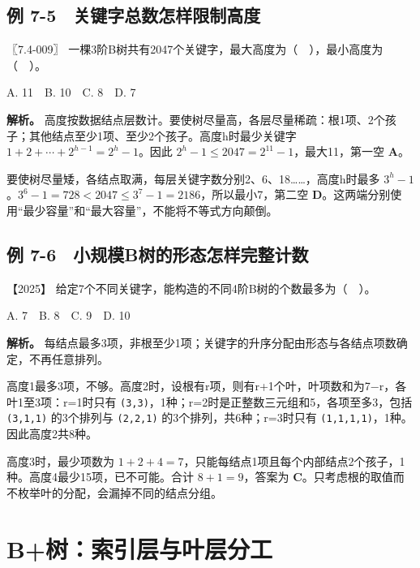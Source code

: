 \subsection{例 7-5　关键字总数怎样限制高度}\label{ds-ex7-5}

\noindent{}〖7.4-009〗 一棵3阶B树共有2047个关键字，最大高度为（　），最小高度为（　）。

A. 11　B. 10　C. 8　D. 7


\textbf{解析。} 高度按数据结点层数计。要使树尽量高，各层尽量稀疏：根1项、2个孩子；其他结点至少1项、至少2个孩子。高度h时最少关键字 \(1+2+\cdots+2^{h-1}=2^h-1\)。因此 \(2^h-1\le2047=2^{11}-1\)，最大11，第一空 \textbf{A}。

要使树尽量矮，各结点取满，每层关键字数分别2、6、18\ldots\ldots，高度h时最多 \(3^h-1\)。\(3^6-1=728<2047\le3^7-1=2186\)，所以最小7，第二空 \textbf{D}。这两端分别使用``最少容量''和``最大容量''，不能将不等式方向颠倒。

\subsection{例 7-6　小规模B树的形态怎样完整计数}\label{ds-ex7-6}

\noindent{}【2025】 给定7个不同关键字，能构造的不同4阶B树的个数最多为（　）。

A. 7　B. 8　C. 9　D. 10


\textbf{解析。} 每结点最多3项，非根至少1项；关键字的升序分配由形态与各结点项数确定，不再任意排列。

高度1最多3项，不够。高度2时，设根有r项，则有r+1个叶，叶项数和为7−r，各叶1至3项：r=1时只有 \allowbreak{}\texttt{(3,}\allowbreak{}\texttt{3)}，1种；r=2时是正整数三元组和5，各项至多3，包括 \allowbreak{}\texttt{(3,}\allowbreak{}\texttt{1,}\allowbreak{}\texttt{1)} 的3个排列与 \allowbreak{}\texttt{(2,}\allowbreak{}\texttt{2,}\allowbreak{}\texttt{1)} 的3个排列，共6种；r=3时只有 \allowbreak{}\texttt{(1,}\allowbreak{}\texttt{1,}\allowbreak{}\texttt{1,}\allowbreak{}\texttt{1)}，1种。因此高度2共8种。

高度3时，最少项数为 \(1+2+4=7\)，只能每结点1项且每个内部结点2个孩子，1种。高度4最少15项，已不可能。合计 \(8+1=9\)，答案为 \textbf{C}。只考虑根的取值而不枚举叶的分配，会漏掉不同的结点分组。

\section{B+树：索引层与叶层分工}\label{ds-07-08}

